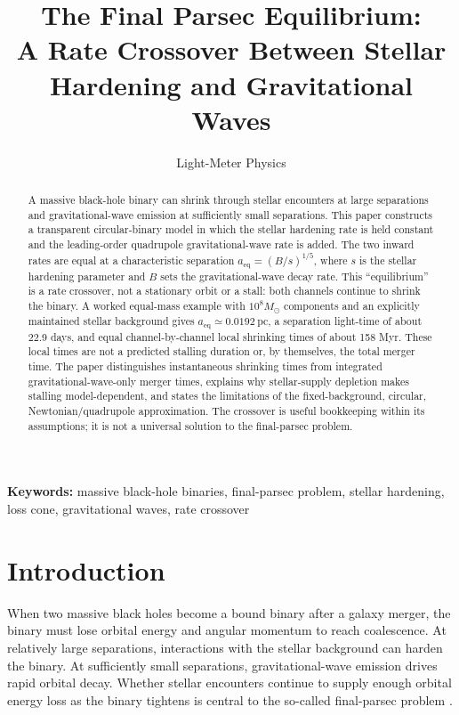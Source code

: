 \documentclass[12pt]{article}
\title{The Final Parsec Equilibrium:\\
A Rate Crossover Between Stellar Hardening and Gravitational Waves}
\author{Light-Meter Physics}
\date{}
\begin{document}
\maketitle

\begin{abstract}
A massive black-hole binary can shrink through stellar encounters at large separations and gravitational-wave emission at sufficiently small separations. This paper constructs a transparent circular-binary model in which the stellar hardening rate is held constant and the leading-order quadrupole gravitational-wave rate is added. The two inward rates are equal at a characteristic separation $a_{\mathrm{eq}}=(B/s)^{1/5}$, where $s$ is the stellar hardening parameter and $B$ sets the gravitational-wave decay rate. This ``equilibrium'' is a rate crossover, not a stationary orbit or a stall: both channels continue to shrink the binary. A worked equal-mass example with $10^8M_\odot$ components and an explicitly maintained stellar background gives $a_{\mathrm{eq}}\simeq0.0192\ \mathrm{pc}$, a separation light-time of about 22.9 days, and equal channel-by-channel local shrinking times of about 158 Myr. These local times are not a predicted stalling duration or, by themselves, the total merger time. The paper distinguishes instantaneous shrinking times from integrated gravitational-wave-only merger times, explains why stellar-supply depletion makes stalling model-dependent, and states the limitations of the fixed-background, circular, Newtonian/quadrupole approximation. The crossover is useful bookkeeping within its assumptions; it is not a universal solution to the final-parsec problem.
\end{abstract}

\noindent\textbf{Keywords:} massive black-hole binaries, final-parsec problem, stellar hardening, loss cone, gravitational waves, rate crossover

\section{Introduction}

When two massive black holes become a bound binary after a galaxy merger, the binary must lose orbital energy and angular momentum to reach coalescence. At relatively large separations, interactions with the stellar background can harden the binary. At sufficiently small separations, gravitational-wave emission drives rapid orbital decay. Whether stellar encounters continue to supply enough orbital energy loss as the binary tightens is central to the so-called final-parsec problem \cite{Quinlan,Gualandris,Vasiliev}.
\end{document}
